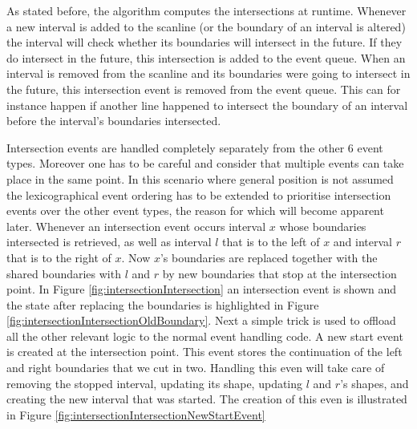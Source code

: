 \documentclass[12pt]{article}
\begin{document}
As stated before, the algorithm computes the intersections at runtime. Whenever a new interval is added to the scanline (or the boundary of an interval is altered) the interval will check whether its boundaries will intersect in the future. If they do intersect in the future, this intersection is added to the event queue. When an interval is removed from the scanline and its boundaries were going to intersect in the future, this intersection event is removed from the event queue. This can for instance happen if another line happened to intersect the boundary of an interval before the interval's boundaries intersected.

Intersection events are handled completely separately from the other 6 event types. Moreover one has to be careful and consider that multiple events can take place in the same point. In this scenario where general position is not assumed the lexicographical event ordering has to be extended to prioritise intersection events over the other event types, the reason for which will become apparent later. Whenever an intersection event occurs interval $x$ whose boundaries intersected is retrieved, as well as interval $l$ that is to the left of $x$ and interval $r$ that is to the right of $x$. Now $x$'s boundaries are replaced together with the shared boundaries with $l$ and $r$ by new boundaries that stop at the intersection point. In Figure \ref{fig:intersectionIntersection} an intersection event is shown and the state after replacing the boundaries is highlighted in Figure \ref{fig:intersectionIntersectionOldBoundary}. Next a simple trick is used to offload all the other relevant logic to the normal event handling code. A new start event is created at the intersection point. This event stores the continuation of the left and right boundaries that we cut in two. Handling this even will take care of removing the stopped interval, updating its shape, updating $l$ and $r$'s shapes, and creating the new interval that was started. The creation of this even is illustrated in Figure \ref{fig:intersectionIntersectionNewStartEvent}
\end{document}
